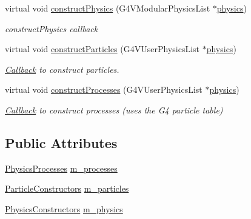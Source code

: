 \begin{DoxyCompactItemize}
virtual void \hyperlink{class_d_d4hep_1_1_simulation_1_1_geant4_physics_list_ac930c930b12719772ec5119cdec72ef1}{construct\+Physics} (G4\+V\+Modular\+Physics\+List $\ast$\hyperlink{class_d_d4hep_1_1_simulation_1_1_geant4_physics_list_a02c18b4acdacd390c3c1b1c4609f1c7b}{physics})
\begin{DoxyCompactList}\small\item\em construct\+Physics callback \end{DoxyCompactList}\item 
virtual void \hyperlink{class_d_d4hep_1_1_simulation_1_1_geant4_physics_list_ab9ccc4c7870b757576312feb8674236a}{construct\+Particles} (G4\+V\+User\+Physics\+List $\ast$\hyperlink{class_d_d4hep_1_1_simulation_1_1_geant4_physics_list_a02c18b4acdacd390c3c1b1c4609f1c7b}{physics})
\begin{DoxyCompactList}\small\item\em \hyperlink{class_d_d4hep_1_1_callback}{Callback} to construct particles. \end{DoxyCompactList}\item 
virtual void \hyperlink{class_d_d4hep_1_1_simulation_1_1_geant4_physics_list_ae769a12f86a3cb785c1e040c5a32d8fb}{construct\+Processes} (G4\+V\+User\+Physics\+List $\ast$\hyperlink{class_d_d4hep_1_1_simulation_1_1_geant4_physics_list_a02c18b4acdacd390c3c1b1c4609f1c7b}{physics})
\begin{DoxyCompactList}\small\item\em \hyperlink{class_d_d4hep_1_1_callback}{Callback} to construct processes (uses the G4 particle table) \end{DoxyCompactList}\end{DoxyCompactItemize}
\subsection*{Public Attributes}
\begin{DoxyCompactItemize}
\item 
\hyperlink{class_d_d4hep_1_1_simulation_1_1_geant4_physics_list_ab41e55687c9d57878fe2e6847a31f19a}{Physics\+Processes} \hyperlink{class_d_d4hep_1_1_simulation_1_1_geant4_physics_list_af3a8295fc76fdab16b92a9cff9b07b56}{m\+\_\+processes}
\item 
\hyperlink{class_d_d4hep_1_1_simulation_1_1_geant4_physics_list_afaee3763aea79b299830be37f9642342}{Particle\+Constructors} \hyperlink{class_d_d4hep_1_1_simulation_1_1_geant4_physics_list_afb427bf428aa0c62f79717a598f60de7}{m\+\_\+particles}
\item 
\hyperlink{class_d_d4hep_1_1_simulation_1_1_geant4_physics_list_a5953826b626c21fa4b26ab9a07f3b8ad}{Physics\+Constructors} \hyperlink{class_d_d4hep_1_1_simulation_1_1_geant4_physics_list_a7b5de6ccab6cd1083de316546cdba96e}{m\+\_\+physics}
\end{DoxyCompactItemize}
